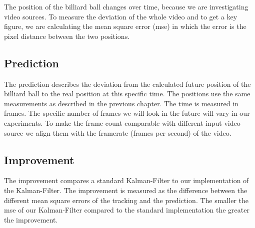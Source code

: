 \documentclass[titlepage, a4paper, 11pt]{scrartcl}
\begin{document}
        The position of the billiard ball changes over time, because we are investigating video sources.
        To measure the deviation of the whole video and to get a key figure, we are calculating the mean square error (mse) in which the error is the pixel distance between the two positions. 

        \subsection{Prediction}

        The prediction describes the deviation from the calculated future position of the billiard ball to the real position at this specific time.
        The positions use the same measurements as described in the previous chapter.
        The time is measured in frames. The specific number of frames we will look in the future will vary in our experiments.
        To make the frame count comparable with different input video source we align them with the framerate (frames per second) of the video.

        \subsection{Improvement}

        The improvement compares a standard Kalman-Filter to our implementation of the Kalman-Filter.
        The improvement is measured as the difference between the different mean square errors of the tracking and the prediction.
        The smaller the mse of our Kalman-Filter compared to the standard implementation the greater the improvement.




\end{document}
